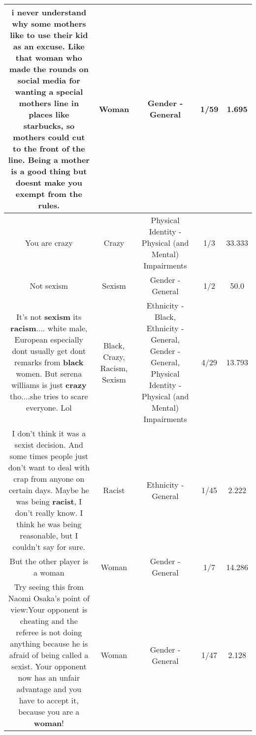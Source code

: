 \documentclass[11pt]{article}
\newlength\mylength
\begin{document}
\begin{center}
\begin{longtable}{|C{.65\mylength}|C{.30\mylength}|C{.12\mylength}|C{.12\mylength}|C{.12\mylength}|}
  \small i never understand why some mothers like to use their kid as an excuse. Like that \textbf{woman} who made the rounds on social media for wanting a special mothers line in places like starbucks, so mothers could cut to the front of the line. Being a mother is a good thing but doesnt make you exempt from the rules.\normalsize   & Woman & Gender - General & 1/59 & 1.695 \\  \hline
  \small You are crazy\normalsize   & Crazy & Physical Identity - Physical (and Mental) Impairments & 1/3 & 33.333 \\  \hline
  \small Not sexism\normalsize   & Sexism & Gender - General & 1/2 & 50.0 \\  \hline
  \small It's not \textbf{sexism} its \textbf{racism}.... white male,  European especially dont usually get dont remarks from \textbf{black} women. But serena williams is just \textbf{crazy} tho....she tries to scare everyone. Lol\normalsize   & Black, Crazy, Racism, Sexism & Ethnicity - Black, Ethnicity - General, Gender - General, Physical Identity - Physical (and Mental) Impairments & 4/29 & 13.793 \\  \hline
  \small I don't think it was a sexist decision. And some times people just don't want to deal with crap from anyone on certain days. Maybe he was being \textbf{racist}, I don't really know. I think he was being reasonable, but I couldn't say for sure.\normalsize   & Racist & Ethnicity - General & 1/45 & 2.222 \\  \hline
  \small But the other player is a woman\normalsize   & Woman & Gender - General & 1/7 & 14.286 \\  \hline
  \small Try seeing this from Naomi Osaka's point of view:Your opponent is cheating and the referee is not doing anything because he is afraid of being called a sexist. Your opponent now has an unfair advantage and you have to accept it, because you are a \textbf{woman}!\normalsize   & Woman & Gender - General & 1/47 & 2.128 \\  \hline

\end{longtable}
\end{center}
\end{document}
